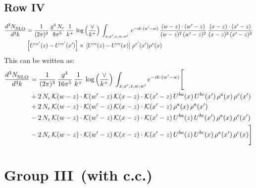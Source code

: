 \documentclass[9pt]{article}
\numberwithin{equation}{section}
\begin{document}
\subsection{Row IV}
\begin{align}
    \frac{d^{3}N_{\rm NLO}^{\rm}}{d^{3}k}  & =      \frac{1}{(2\pi)^{3}}\,\frac{g^{4}\,N_{c}}{8\pi^{5}}\,\frac{1}{k^{+}}\,\log{\left(\frac{\vee}{k^{+}}\right)}\,\int_{x,x',z,w,w'}\,e^{-ik\cdot (w'-w)}\,\frac{(w-z)\cdot(w'-z)}{(w-z)^{2}\,(w'-z)^{2}}\,\frac{(x-z)\cdot(x'-z)}{(x-z)^{2}\,(x'-z)^{2}}\notag \\ &   \left[U^{ce'}(z) - U^{ce'}(x')\right] \times\, \left[U^{ce}(z) - U^{ce}(x)\right]\, \rho^{e'}(x') \rho^{e}(x)
\end{align}
This can be written as: 
\begin{align}
    \frac{d^{3}N_{\rm NLO}^{\rm}}{d^{3}k}  & = \frac{1}{(2\pi)^{3}}\,\frac{g^{4}}{16\pi^{5}}\,\frac{1}{k^{+}}\,\log{\left(\frac{\vee}{k^{+}}\right)}\, \int_{x,x',z,w,w'}e^{-ik\cdot(w'-w)}\Bigg[\notag\\ & +2\,N_{c}\,\mathcal{K}(w-z)\cdot\mathcal{K}(w'-z)\,\mathcal{K}(x-z)\cdot\mathcal{K}(x'-z)\,U^{ba}(x)\,U^{bc}(x')\,\rho^{a}(x)\,\rho^{c}(x')\notag \\ 
&+2\,N_{c}\,\mathcal{K}(w-z)\cdot\mathcal{K}(w'-z)\,\mathcal{K}(x-z)\cdot\mathcal{K}(x'-z)\,\rho^{a}(x)\,\rho^{a}(x')\notag \\ 
&-2\,N_{c}\,\mathcal{K}(w-z)\cdot\mathcal{K}(w'-z)\,\mathcal{K}(x-z)\cdot\mathcal{K}(x'-z)\,U^{ba}(z)\,U^{bc}(x')\,\rho^{a}(x)\,\rho^{c}(x')\notag \\ 
&-2\,N_{c}\,\mathcal{K}(w-z)\cdot\mathcal{K}(w'-z)\,\mathcal{K}(x-z)\cdot\mathcal{K}(x'-z)\,U^{ba}(z)\,U^{bc}(x)\,\rho^{a}(x')\,\rho^{c}(x)\Bigg]
\end{align}
\section{Group III\, (with c.c.)}
\end{document}
